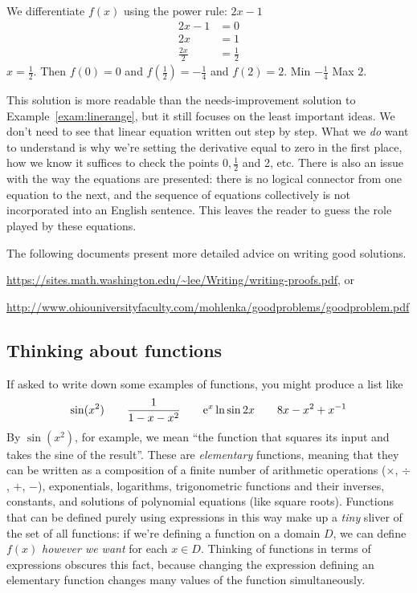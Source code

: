 \documentclass[prettycode,shellescape]{watsonbook}
\begin{document}
\begin{solution}[title=Solution that needs improvement] 
  We differentiate $f(x)$ using the power rule: $2x-1$
  \begin{align*}
    2x - 1 &= 0 \\
    2x &= 1  \\
    \frac{2x}{2} &= \frac{1}{2}
  \end{align*}
  $x = \tfrac{1}{2}$. Then $f(0) = 0$ and $f(\tfrac{1}{2}) =
  -\tfrac{1}{4}$ and $f(2) = 2$. Min $-\tfrac{1}{4}$ Max $2$. 
\end{solution}

This solution is more readable than the needs-improvement solution to
Example~\ref{exam:linerange}, but it still focuses on the least
important ideas.  We don't need to see that linear equation written
out step by step. What we \textit{do} want to understand is why we're
setting the derivative equal to zero in the first place, how we know
it suffices to check the points $0, \tfrac{1}{2}$ and 2, etc. There is
also an issue with the way the equations are presented: there is no
logical connector from one equation to the next, and the sequence of
equations collectively is not incorporated into an English
sentence. This leaves the reader to guess the role played by these
equations.

The following documents present more detailed advice on writing good
solutions.
\begin{center}
  \url{https://sites.math.washington.edu/~lee/Writing/writing-proofs.pdf},
  or 

  \url{http://www.ohiouniversityfaculty.com/mohlenka/goodproblems/goodproblem.pdf}
\end{center}

\subsection{Thinking about functions} \label{sec:whatisafunction}

If asked to write down some examples of functions, you might produce a
list like
\[
  \sin(x^2) \qquad \frac{1}{1-x-x^2} \qquad \mathrm{e}^{x}\ln \sin 2x \qquad
  8x - x^2 + x^{-1}
\]
By $\sin(x^2)$, for example, we mean ``the function that squares its
input and takes the sine of the result''. These are
\textit{elementary} functions, meaning that they can be written as a
composition of a finite number of arithmetic operations ($\times$,
$\div$, $+$, $-$), exponentials, logarithms, trigonometric functions
and their inverses, constants, and solutions of polynomial equations
(like square roots). Functions that can be defined purely using
expressions in this way make up a \textit{tiny} sliver of the set of
all functions: if we're defining a function on a domain $D$, we can
define $f(x)$ \textit{however we want} for each $x\in D$. Thinking of
functions in terms of expressions obscures this fact, because changing
the expression defining an elementary function changes many values of
the function simultaneously.
\end{document}
